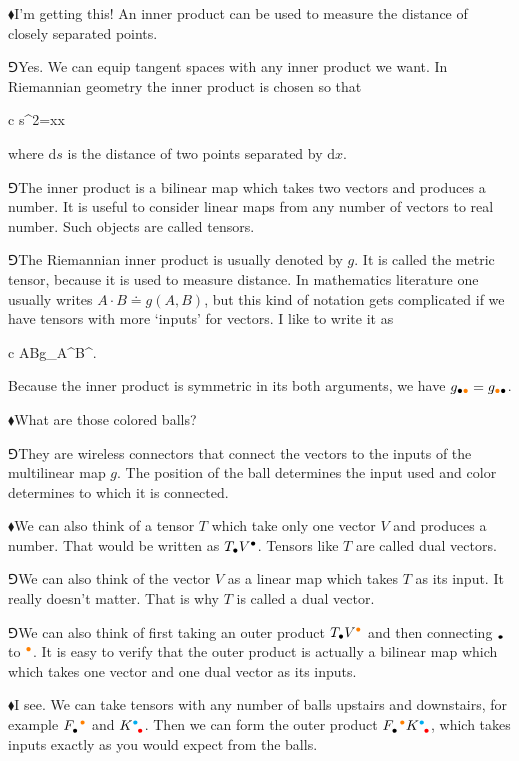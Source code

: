 \documentclass[10pt,oneside%
]{memoir}
\newenvironment{eqna}{\begin{IEEEeqnarray*}{c}}{\end{IEEEeqnarray*}\ignorespacesafterend}
\newcommand{\dd}{\mathrm{d}}
\newcommand{\tensay}[3]{#1_{#2}^{\phantom{#2}#3}}
\newcommand{\tensya}[3]{#1^{#2}_{\phantom{#2}#3}}
\newcommand{\coa}{{\color{black}\bullet}}
\newcommand{\cob}{{\color{oranssi}\bullet}}
\newcommand{\coc}{{\color{cyan}\bullet}}
\newcommand{\cod}{{\color{red}\bullet}}
\newcommand{\hea}{\(\blacklozenge\)\;}
\newcommand{\heb}{\(\Game\)\;}
\begin{document}
\hea I'm getting this! An inner product can be used to measure the distance of closely separated points.

\heb Yes. We can equip tangent spaces with any inner product we want. In Riemannian geometry the inner product is chosen so that
\begin{eqna}
    \dd s^2=\dd x\cdot\dd x
\end{eqna}
where \(\dd s\) is the distance of two points separated by \(\dd x\).

\heb The inner product is a bilinear map which takes two vectors and produces a number. It is useful to consider linear maps from any number of vectors to real number. Such objects are called tensors.

\heb The Riemannian inner product is usually denoted by \(g\). It is called the metric tensor, because it is used to measure distance. In mathematics literature one usually writes \(A\cdot B\doteq g(A,B)\), but this kind of notation gets complicated if we have tensors with more `inputs' for vectors. I like to write it as
\begin{eqna}
    A\cdot B\doteq g_{\coa\cob}A^\coa B^\cob.
\end{eqna}
Because the inner product is symmetric in its both arguments, we have \(g_{\coa\cob}=g_{\cob\coa}\).

\hea What are those colored balls?

\heb They are wireless connectors that connect the vectors to the inputs of the multilinear map \(g\). The position of the ball determines the input used and color determines to which it is connected.

\hea We can also think of a tensor \(T\) which take only one vector \(V\) and produces a number. That would be written as \(T_\coa V^\coa\). Tensors like \(T\) are called dual vectors.

\heb We can also think of the vector \(V\) as a linear map which takes \(T\) as its input. It really doesn't matter. That is why \(T\) is called a dual vector.

\heb We can also think of first taking an outer product \(T_\coa V^\cob\) and then connecting \(_\coa\) to \(^\cob\). It is easy to verify that the outer product is actually a bilinear map which which takes one vector and one dual vector as its inputs.

\hea I see. We can take tensors with any number of balls upstairs and downstairs, for example \(\tensay{F}{\coa}{\cob}\) and \(\tensya{K}{\coc}{\cod}\). Then we can form the outer product \(\tensay{F}{\coa}{\cob}\tensya{K}{\coc}{\cod}\), which takes inputs exactly as you would expect from the balls.
\end{document}
